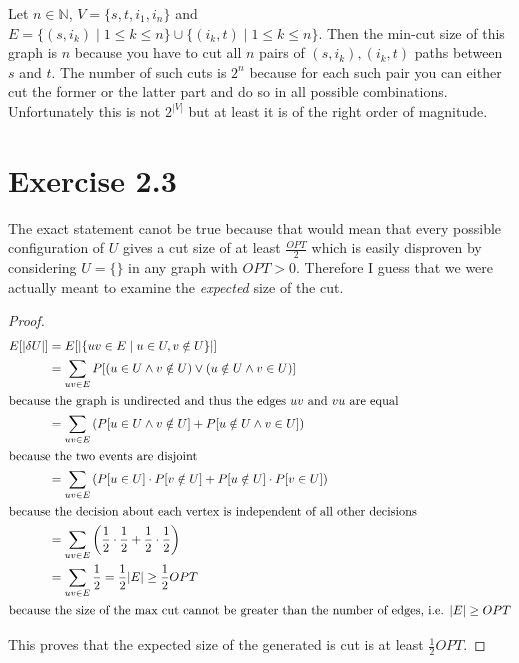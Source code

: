 \documentclass[10pt,a4paper]{article}
\begin{document}
Let $n \in \mathbb{N}$, $V = \{ s, t, i_{1}, i_{n} \}$ and $E = \{ (s, i_{k}) \mid 1 \le k \le n \} \cup \{ (i_{k}, t) \mid 1 \le k \le n \}$.
Then the min-cut size of this graph is $n$ because you have to cut all $n$ pairs of $(s, i_{k}), (i_{k}, t)$ paths between $s$ and $t$.
The number of such cuts is $2^{n}$ because for each such pair you can either cut the former or the latter part and do so in all possible combinations.
Unfortunately this is not $2^{|V|}$ but at least it is of the right order of magnitude.

\section*{Exercise 2.3}

The exact statement canot be true because that would mean that every possible configuration of $U$ gives a cut size of at least $\frac{OPT}{2}$ which is easily disproven by considering $U = \{  \}$ in any graph with $OPT > 0$.
Therefore I guess that we were actually meant to examine the \emph{expected} size of the cut.

\begin{proof}
  \begin{align*}
    E[|\delta U|] & = E[|\{ uv \in E \mid u \in U, v \notin U \}|]\\
                  & = \sum_{uv \in E} P[(u \in U \land v \notin U) \lor (u \notin U \land v \in U)]\\
    \intertext{because the graph is undirected and thus the edges $uv$ and $vu$ are equal}
                  & = \sum_{uv \in E} \left( P[u \in U \land v \notin U] + P[u \notin U \land v \in U] \right)\\
    \intertext{because the two events are disjoint}
                  & = \sum_{uv \in E} \left( P[u \in U] \cdot P[v \notin U] + P[u \notin U] \cdot P[v \in U] \right)\\
    \intertext{because the decision about each vertex is independent of all other decisions}
                  & = \sum_{uv \in E} \left( \frac{1}{2} \cdot \frac{1}{2} + \frac{1}{2} \cdot \frac{1}{2} \right)\\
                  & = \sum_{uv \in E} \frac{1}{2} = \frac{1}{2} |E| \ge \frac{1}{2} OPT\\
    \intertext{because the size of the max cut cannot be greater than the number of edges, i.e. $|E| \ge OPT$}
  \end{align*}

  This proves that the expected size of the generated is cut is at least $\frac{1}{2}OPT$.
\end{proof}
\end{document}
